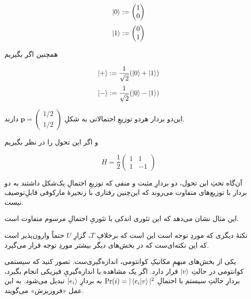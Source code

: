 \begin{equation} \ket{0} := \begin{pmatrix} 1 \\ 0 \end{pmatrix} \end{equation}
\begin{equation} \ket{1} := \begin{pmatrix} 0 \\ 1 \end{pmatrix} \end{equation}

همچنین اگر بگیریم

\begin{equation} \ket{+} := \frac{1}{\sqrt{2}} (\ket{0} + \ket{1}) \end{equation}
\begin{equation} \ket{-} := \frac{1}{\sqrt{2}} (\ket{0} - \ket{1}) \end{equation}

این‌دو بردار هردو توزیعِ احتمالاتی به شکلِ 
\(\mathbf{p} = \begin{pmatrix} 1/2 \\ 1/2 \end{pmatrix} \)
دارند.

و اگر این تحول را در نظر بگیریم

\begin{equation} H = \frac{1}{2} \begin{pmatrix} 1 & 1 \\ 1 & -1 \end{pmatrix} \end{equation}

آن‌گاه تحتِ این تحول، دو بردارِ مثبت و منفی که توزیعِ احتمالِ یک‌شکل داشتند به دو بردار با توزیع‌های متفاوت می‌روند که این‌چنین رفتاری با زنجیرهٔ مارکوفی قابلِ‌توصیف نیست.

این مثال نشان می‌دهد که این تئوری اندکی با تئوریِ احتمالِ مرسوم متفاوت است.

نکتهٔ دیگری که موردِ‌ توجه است این است که برخلافِ \(T\)، گزارِ \(U\) حتماً وارون‌پذیر است که این نکته‌ای‌ست که در بخش‌های دیگر بیشتر موردِ توجه قرار می‌گیرد.


یکی از بخش‌های مبهمِ مکانیکِ کوانتومی، اندازه‌گیری‌ست. تصور کنید که سیستمی کوانتومی در حالتِ
\(\ket{v}\)
قرار دارد. اگر یک مشاهده یا اندازه‌گیریِ فیزیکی انجام بگیرد، بردارِ حالتِ سیستم با احتمالِ
\(\Pr(i) = |\braket{e_i}{v}|^2\)
به بردارِ 
\(\ket{e_i}\)
تبدیل می‌شود. به این عمل «فروریزش» می‌گویند.

